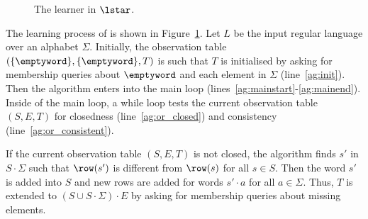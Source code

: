 \begin{figure}[h]
  \centering
  \begin{algorithmic}[1]
    
    \label{ag:init}
    \Repeat\label{ag:mainstart}
    \label{ag:or_closed}
    \EndIf
    \label{ag:or_consistent}
    
    \EndIf
    \EndWhile
    \EndIf
    \label{ag:mainend}
  \end{algorithmic}
  \caption{The learner in $\lstar$.}\label{Angluin_LA}
\end{figure}

The learning process of \lstar is shown in Figure~\ref{Angluin_LA}.
%
Let  $L$ be the input regular language over an alphabet $\Sigma$.
%
Initially, the observation table $(\{\emptyword\},\{\emptyword\},T)$
is such that $T$ is initialised by asking for membership queries about
$\emptyword$ and each element in $\Sigma$ (line~\ref{ag:init}).
%
Then the algorithm enters into the main loop
(lines~\ref{ag:mainstart}-\ref{ag:mainend}). Inside of the main loop,
a while loop tests the current observation table $(S,E,T)$ for
closedness (line~\ref{ag:or_closed}) and consistency
(line~\ref{ag:or_consistent}).

If the current observation table $(S,E,T)$ is not closed, the
algorithm finds $s'$ in $S\cdot \Sigma$ such that $\row(s')$ is
different from $\row(s)$ for all $s\in S$. Then the word $s'$ is added
into $S$ and new rows are added for words $s'\cdot a$ for all
$a\in \Sigma$. Thus, $T$ is extended to $(S\cup S\cdot \Sigma)\cdot E$
by asking for membership queries about missing elements.

